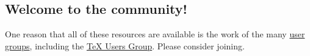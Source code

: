 \documentclass[11pt]{article}
\begin{document}
\begin{multicols*}{2}
\section{Welcome to the community!}

One reason that all of these resources are available is 
the work of the many
\href{https://tug.org/usergroups.html}{user groups}, 
including the \href{https://tug.org/}{\TeX{} Users Group}.
Please consider joining.

\vspace*{2ex}
\noindent{\color{lightblue}\rule{\linewidth}{0.4pt}}

\theendnotes

\end{multicols*}
\end{document}
